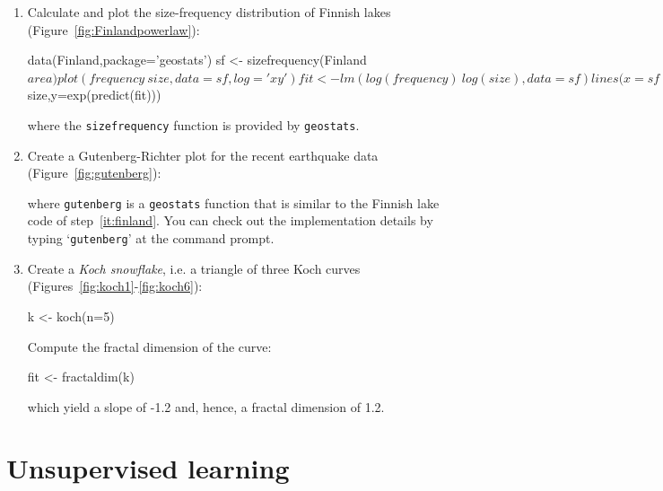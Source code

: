 \begin{enumerate}
  
\item\label{it:finland} Calculate and plot the size-frequency
  distribution of Finnish lakes (Figure~\ref{fig:Finlandpowerlaw}):

\begin{script}
data(Finland,package='geostats')
sf <- sizefrequency(Finland$area)
plot(frequency~size,data=sf,log='xy')
fit <- lm(log(frequency)~log(size),data=sf)
lines(x=sf$size,y=exp(predict(fit)))
\end{script}

\noindent where the \texttt{sizefrequency} function is provided by
\texttt{geostats}.\medskip

\item Create a Gutenberg-Richter plot for the recent earthquake data
  (Figure~\ref{fig:gutenberg}):


\noindent where \texttt{gutenberg} is a \texttt{geostats} function
that is similar to the Finnish lake code of step~\ref{it:finland}. You
can check out the implementation details by typing
`\texttt{gutenberg}' at the command prompt.

\item Create a \textit{Koch snowflake}, i.e. a triangle of three Koch
  curves (Figures~\ref{fig:koch1}-\ref{fig:koch6}):

\begin{script}
k <- koch(n=5)
\end{script}

Compute the fractal dimension of the curve:

\begin{script}[firstnumber=2]
fit <- fractaldim(k)
\end{script}

\noindent which yield a slope of -1.2 and, hence, a fractal dimension
of 1.2.

\end{enumerate}

\section{Unsupervised learning}
\label{sec:R-unsupervised}

